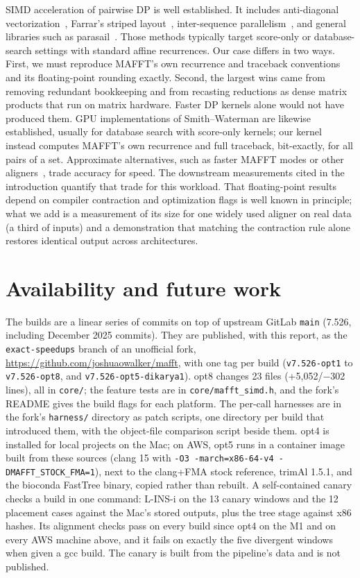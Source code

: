 \documentclass[11pt]{article}
\newcommand{\code}[1]{\texttt{#1}}
\begin{document}
SIMD acceleration of pairwise DP is well established. It includes anti-diagonal
vectorization~\cite{wozniak1997}, Farrar's striped layout~\cite{farrar2007}, inter-sequence
parallelism~\cite{rognes2011}, and general libraries such as parasail~\cite{daily2016}.
Those methods typically target score-only or database-search settings with standard
affine recurrences. Our case differs in two ways. First, we must reproduce MAFFT's own
recurrence and traceback conventions and its floating-point rounding exactly. Second, the
largest wins came from removing redundant bookkeeping and from recasting reductions as
dense matrix products that run on matrix hardware. Faster DP kernels alone would not have
produced them. GPU implementations of Smith--Waterman are likewise established, usually for database search
with score-only kernels; our kernel instead computes MAFFT's own recurrence and full
traceback, bit-exactly, for all pairs of a set. Approximate alternatives, such as faster MAFFT modes or other
aligners~\cite{vaser2017}, trade accuracy for speed. The downstream measurements cited
in the introduction quantify that trade for this workload. That floating-point results
depend on compiler contraction and optimization flags is well known in principle; what we
add is a measurement of its size for one widely used aligner on real data (a third of
inputs) and a demonstration that matching the contraction rule alone restores identical
output across architectures.

\section{Availability and future work}
\label{sec:avail}

The builds are a linear series of commits on top of upstream GitLab \code{main} (7.526,
including December 2025 commits). They are published, with this report, as the
\code{exact-speedups} branch of an unofficial fork,
\url{https://github.com/joshuaowalker/mafft}, with one tag per build (\code{v7.526-opt1} to
\code{v7.526-opt8}, and \code{v7.526-opt5-dikarya1}). opt8 changes 23 files (+5{,}052/$-$302
lines), all in \code{core/}; the feature tests are in \code{core/mafft\_simd.h}, and the fork's
README gives the build flags for each platform. The per-call harnesses are in the fork's
\code{harness/} directory as patch scripts, one directory per build that introduced them, with
the object-file comparison script beside them. opt4 is installed for local projects on the Mac;
on AWS, opt5 runs in a container image built from these sources (clang 15 with \code{-O3
-march=x86-64-v4 -DMAFFT\_STOCK\_FMA=1}), next to the clang+FMA stock reference, trimAl 1.5.1,
and the bioconda FastTree binary, copied rather than rebuilt. A self-contained canary checks a
build in one command: L-INS-i on the 13 canary windows and the 12 placement cases against the
Mac's stored outputs, plus the tree stage against x86 hashes. Its alignment checks pass on every
build since opt4 on the M1 and on every AWS machine above, and it fails on exactly the five divergent windows when given a gcc
build. The canary is built from the pipeline's data and is not published.
\end{document}
